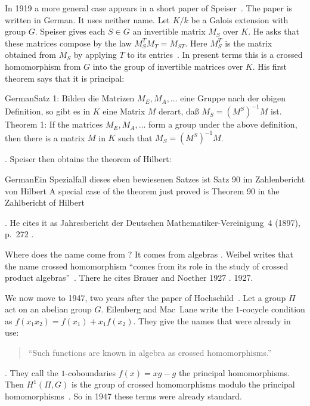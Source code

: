 In 1919 a more general case appears in a short paper of Speiser~\cite{Speiser1919}.
The paper is written in German. It uses neither name. Let $K/k$ be a Galois
extension with group $G$. Speiser gives each $S \in G$ an invertible matrix
$M_S$ over $K$. He asks that these matrices compose by the law
$M_S^{T} M_T = M_{ST}$. Here $M_S^{T}$ is the matrix obtained from $M_S$ by
applying $T$ to its entries~\cite[p.~2]{Speiser1919}. In present terms this
is a crossed homomorphism from $G$ into the group of invertible matrices over
$K$. His first theorem says that it is principal:
\begin{originalquote}{German}{Satz 1: Bilden die Matrizen $M_E, M_A, \ldots$ eine Gruppe nach der obigen Definition, so gibt es in $K$ eine Matrix $M$ derart, da\ss{} $M_S = (M^S)^{-1} M$ ist.}
Theorem 1: If the matrices $M_E, M_A, \ldots$ form a group under the above
definition, then there is a matrix $M$ in $K$ such that $M_S = (M^S)^{-1} M$.
\end{originalquote}
\noindent\cite[p.~2]{Speiser1919}. Speiser then obtains the theorem of
Hilbert:
\begin{originalquote}{German}{Ein Spezialfall dieses eben bewiesenen Satzes ist Satz 90 im Zahlenbericht von Hilbert}
A special case of the theorem just proved is Theorem 90 in the Zahlbericht of
Hilbert
\end{originalquote}
\noindent\cite[p.~3]{Speiser1919}. He cites it as Jahresbericht der Deutschen
Mathematiker-Vereinigung~4 (1897), p.~272 \cite[p.~3]{Speiser1919}.

Where does the name come from \cite[p.~806]{Weibel1999History}? It comes from
algebras \cite[p.~806]{Weibel1999History}. Weibel writes that the name crossed
homomorphism ``comes from its role in the study of crossed product
algebras''~\cite[p.~806]{Weibel1999History}. There he cites Brauer and Noether
1927 \cite[p.~806]{Weibel1999History}.
1927.

We now move to 1947, two years after the paper of Hochschild~\cite[\S 3]{EilenbergMacLane1947}. Let a group $\Pi$ act on an abelian group $G$. Eilenberg and Mac~Lane write
the $1$-cocycle condition as $f(x_1x_2) = f(x_1) + x_1 f(x_2)$. They give the
names that were already in use:
\begin{quote}\small
``Such functions are known in algebra as crossed homomorphisms.''
\end{quote}
\noindent\cite[\S 3]{EilenbergMacLane1947}. They call the $1$-coboundaries
$f(x) = xg - g$ the principal homomorphisms. Then $H^1(\Pi,G)$ is the group of
crossed homomorphisms modulo the principal
homomorphisms~\cite[\S 3]{EilenbergMacLane1947}. So in 1947 these terms were
already standard.

